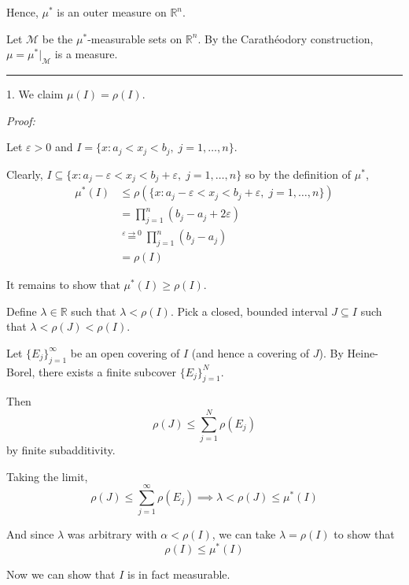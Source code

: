 \documentclass[12pt]{article}
\newcommand{\R}{\mathbb{R}}
\newcommand{\ep}{\varepsilon}
\newcommand{\M}{\mathcal{M}}
\newcommand{\sub}{\subseteq}
\renewcommand{\div}{\vspace*{10pt}\hrule\vspace*{10pt}}
\newenvironment*{proof}[1][blue]{
    \begin{tcolorbox}[
        parbox=false,
        colback=#1!5!white,
        colframe=#1!75!black,
        coltext=#1,
        breakable
    ]}
    {\end{tcolorbox}}
\begin{document}
    Hence, $\mu^*$ is an outer measure on $\R^n$.

    Let $\M$ be the $\mu^*$-measurable sets on $\R^n$. By the Carathéodory construction, $\mu =\mu^*\bigg\vert_{\M}$ is a measure. 

    \div 
    1. We claim $\mu(I) = \rho(I)$.

    \begin{proof}
        \emph{Proof:}
    
        Let $\ep > 0$ and $I = \{x: a_j < x_j < b_j,\; j = 1, \dots, n\}$.

        Clearly, $I \sub \{x: a_j - \ep < x_j < b_j + \ep,\; j=1, \dots, n\}$ so by the definition of $\mu^*$,
        \begin{align*}
            \mu^*(I) &\leq \rho(\{x: a_j - \ep < x_j < b_j + \ep,\; j=1, \dots, n\})\\ 
                &= \prod_{j=1}^n (b_j - a_j + 2\ep)\\ 
                &\overset{\ep \to 0}{=} \prod_{j=1}^n (b_j - a_j)\\ 
                &= \rho(I)
        \end{align*}

        It remains to show that $\mu^*(I) \geq \rho(I)$. 

        Define $\lambda \in \R$ such that $\lambda < \rho(I)$. Pick a closed, bounded interval $J \sub I$ such that $\lambda < \rho(J) < \rho(I)$. 

        Let $\{E_j\}_{j=1}^{\infty}$ be an open covering of $I$ (and hence a covering of $J$). By Heine-Borel, there exists a finite subcover $\{E_j\}_{j=1}^N$.

        Then 
        \[\rho(J) \leq \sum_{j=1}^N \rho(E_j)\]
        by finite subadditivity.

        Taking the limit, 
        \[\rho(J) \leq \sum_{j=1}^\infty \rho(E_j) \implies \lambda < \rho(J) \leq \mu^*(I)\]

        And since $\lambda$ was arbitrary with $\alpha < \rho(I)$, we can take $\lambda = \rho(I)$ to show that 
        \[\rho(I) \leq \mu^*(I)\]
    \end{proof}

    Now we can show that $I$ is in fact measurable.
\end{document}
